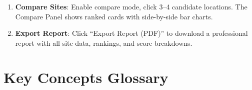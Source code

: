 \documentclass[12pt, a4paper]{article}
\begin{document}
\begin{enumerate}[leftmargin=2em, itemsep=8pt]
    \item \textbf{Compare Sites}: Enable compare mode, click 3--4 candidate locations. The
          Compare Panel shows ranked cards with side-by-side bar charts.

    \item \textbf{Export Report}: Click ``Export Report (PDF)'' to download a professional
          report with all site data, rankings, and score breakdowns.
\end{enumerate}

\newpage

\section{Key Concepts Glossary}
\end{document}
